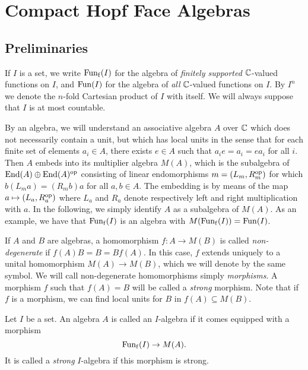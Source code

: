 \section{Compact Hopf Face Algebras}


\subsection{Preliminaries}

If $I$ is a set, we write $\mathrm{Fun}_{\operatorname{\mathrm{f}}}(I)$ for the algebra of
\emph{finitely supported} $\mathbb{C}$-valued functions on $I$, and $\mathrm{Fun}(I)$
for the algebra of \emph{all} $\mathbb{C}$-valued functions on $I$. By $I^n$
we denote the $n$-fold Cartesian product of $I$ with itself. We will
always suppose that $I$ is at most countable.

By an algebra, we will understand an associative algebra $A$ over $\mathbb{C}$
which does not necessarily contain a unit, but which has local units
in the sense that for each finite set of elements $a_i\in A$, there
exists $e\in A$ such that $a_ie=a_i=ea_i$ for all $i$. Then $A$ embeds
into its multiplier algebra $M(A)$, which is the subalgebra of
$\operatorname{\mathrm{End}}(A)\oplus \operatorname{\mathrm{End}}(A)^{\operatorname{\mathrm{op}}}$ consisting of linear endomorphisms $m =
(L_m,R_m^{\operatorname{\mathrm{op}}})$ for which $b(L_ma) = (R_mb)a$ for all $a,b\in A$. The
embedding is by means of the map $a \mapsto (L_a,R_a^{\operatorname{\mathrm{op}}})$ where
$L_a$ and $R_a$ denote respectively left and right multiplication with
$a$. In the following, we simply identify $A$ as a subalgebra of
$M(A)$. As an example, we have that $\mathrm{Fun}_{\operatorname{\mathrm{f}}}(I)$ is an algebra
with $M(\mathrm{Fun}_{\operatorname{\mathrm{f}}}(I)) = \mathrm{Fun}(I)$.

If $A$ and $B$ are algebras, a homomorphism $f:A\rightarrow M(B)$ is
called \emph{non-degenerate} if $f(A)B = B = Bf(A)$. In this case, $f$
extends uniquely to a unital homomorphism $M(A)\rightarrow M(B)$,
which we will denote by the same symbol. We will call non-degenerate
homomorphisms simply \emph{morphisms}. A morphism $f$ such that
$f(A)=B$ will be called a \emph{strong} morphism. Note that if $f$ is
a morphism, we can find local units for $B$ in $f(A)\subseteq M(B)$.

\begin{Def} Let $I$ be a set. An algebra $A$ is called an $I$-algebra
  if it comes equipped with a morphism \[\mathrm{Fun}_{\operatorname{\mathrm{f}}}(I) \rightarrow
  M(A).\] It is called a \emph{strong} $I$-algebra if this morphism is
  strong.
\end{Def}

